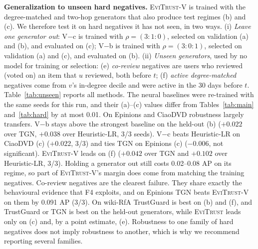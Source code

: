 \documentclass[conference]{IEEEtran}
\newcommand{\evi}{\textsc{EviTrust}}
\newcommand{\eviV}{\textsc{EviTrust}-V}
\begin{document}
\textbf{Generalization to unseen hard negatives.} \eviV{} is trained with the degree-matched and two-hop generators that also produce test regimes (b) and (c). We therefore test it on hard negatives it has not seen, in two ways. (i) \emph{Leave one generator out}: V$-$c is trained with $\rho=(3{:}1{:}0)$, selected on validation (a) and (b), and evaluated on (c); V$-$b is trained with $\rho=(3{:}0{:}1)$, selected on validation (a) and (c), and evaluated on (b). (ii) \emph{Unseen generators}, used by no model for training or selection: (e) \emph{co-review} negatives are users who reviewed (voted on) an item that $u$ reviewed, both before $t$; (f) \emph{active degree-matched} negatives come from $v$'s in-degree decile and were active in the 30 days before $t$. Table~\ref{tab:unseen} reports all methods. The neural baselines were re-trained with the same seeds for this run, and their (a)--(c) values differ from Tables~\ref{tab:main} and~\ref{tab:hard} by at most 0.01.
On Epinions and CiaoDVD robustness largely transfers. V$-$b stays above the strongest baseline on the held-out (b) ($+0.022$ over TGN, $+0.038$ over Heuristic-LR, 3/3 seeds). V$-$c beats Heuristic-LR on CiaoDVD (c) ($+0.022$, 3/3) and ties TGN on Epinions (c) ($-0.006$, not significant). \eviV{} leads on (f) ($+0.042$ over TGN and $+0.102$ over Heuristic-LR, 3/3). Holding a generator out still costs 0.02--0.08 AP on its regime, so part of \eviV{}'s margin does come from matching the training negatives.
Co-review negatives are the clearest failure. They share exactly the behavioural evidence that F4 exploits, and on Epinions TGN beats \eviV{} on them by 0.091 AP (3/3). On wiki-RfA TrustGuard is best on (b) and (f), and TrustGuard or TGN is best on the held-out generators, while \evi{} leads only on (c) and, by a point estimate, (e). Robustness to one family of hard negatives does not imply robustness to another, which is why we recommend reporting several families.
\end{document}
